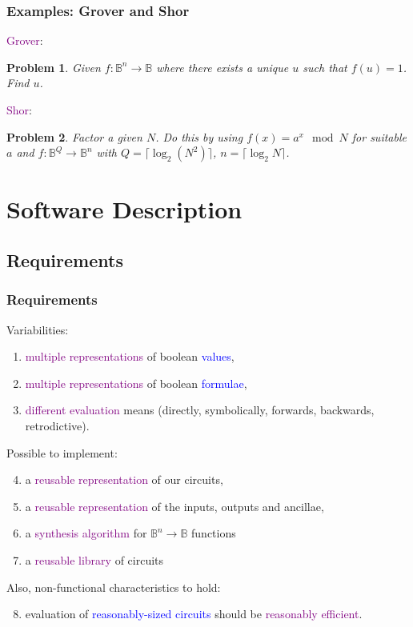 \documentclass{beamer}
\newcommand{\Bool}{\ensuremath{\mathbb{B}}}
\newtheorem{prob}{Problem}
\newcommand{\pub}[1]{\textcolor{purple}{#1}}
\newcommand{\blu}[1]{\textcolor{blue}{#1}}
\begin{document}
\begin{frame}
  \frametitle{Examples: Grover and Shor}
  \pub{Grover}:
\begin{prob}
    Given $f : \Bool^n\rightarrow\Bool$ where there exists a unique $u$
    such that $f(u)=1$. Find $u$.
\end{prob}

  \vspace*{8mm}
  \pub{Shor}:
\begin{prob}
  Factor a given $N$. Do this by using $f(x) = a^x \mod N$ for suitable $a$ and
  $f : \Bool^Q \rightarrow \Bool^n$ with $Q = \lceil \log_2 \left(N^2\right) \rceil$,
  $n = \lceil \log_2 N \rceil$.
\end{prob}

\end{frame}


\section[Software]{Software Description}
\subsection[Requirements]{Requirements}
\begin{frame}
  \frametitle{Requirements}
  Variabilities:
\begin{enumerate}
  \item \pub{multiple representations} of boolean \blu{values},
  \item \pub{multiple representations} of boolean \blu{formulae}, 
  \item \pub{different evaluation} means (directly, symbolically, forwards,
    backwards, retrodictive).
\end{enumerate}

\noindent Possible to implement:
\begin{enumerate}
    \setcounter{enumi}{3}
  \item a \pub{reusable representation} of our circuits,
  \item a \pub{reusable representation} of the inputs, outputs and ancillae,
  \item a \pub{synthesis algorithm} for $\Bool^n\rightarrow\Bool$ functions
  \item a \pub{reusable library} of circuits
\end{enumerate}

Also, non-functional characteristics to hold:
\begin{enumerate}
    \setcounter{enumi}{7}
  \item evaluation of \blu{reasonably-sized circuits} should be 
    \pub{reasonably efficient}.
\end{enumerate}

\end{frame}
\end{document}
